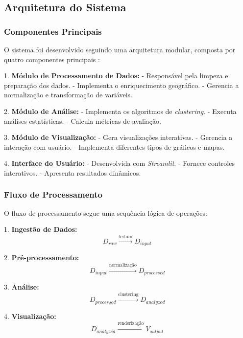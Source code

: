 \documentclass[conference]{IEEEtran}
\begin{document}
\subsection{Arquitetura do Sistema}

\subsubsection{Componentes Principais}
O sistema foi desenvolvido seguindo uma arquitetura modular, composta por quatro componentes principais :

1. \textbf{Módulo de Processamento de Dados:}
   - Responsável pela limpeza e preparação dos dados.
   - Implementa o enriquecimento geográfico.
   - Gerencia a normalização e transformação de variáveis.

2. \textbf{Módulo de Análise:}
   - Implementa os algoritmos de \textit{clustering}.
   - Executa análises estatísticas.
   - Calcula métricas de avaliação.

3. \textbf{Módulo de Visualização:}
   - Gera visualizações interativas.
   - Gerencia a interação com usuário.
   - Implementa diferentes tipos de gráficos e mapas.

4. \textbf{Interface do Usuário:}
   - Desenvolvida com \textit{Streamlit}.
   - Fornece controles interativos.
   - Apresenta resultados dinâmicos.

\subsubsection{Fluxo de Processamento}
O fluxo de processamento segue uma sequência lógica de operações:

1. \textbf{Ingestão de Dados:}
\begin{equation}
D_{raw} \xrightarrow{\text{leitura}} D_{input}
\end{equation}

2. \textbf{Pré-processamento:}
\begin{equation}
D_{input} \xrightarrow{\text{normalização}} D_{processed}
\end{equation}

3. \textbf{Análise:}
\begin{equation}
D_{processed} \xrightarrow{\text{clustering}} D_{analyzed}
\end{equation}

4. \textbf{Visualização:}
\begin{equation}
D_{analyzed} \xrightarrow{\text{renderização}} V_{output}
\end{equation}
\end{document}
